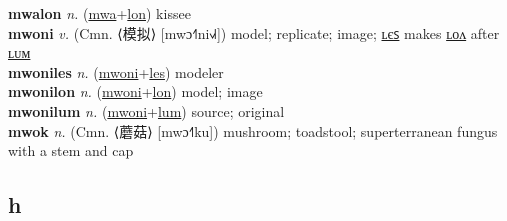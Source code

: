 \textbf{mwalon} \textit{n.} (\hyperref[mwa]{mwa}+\hyperref[lon]{lon})
kissee \label{mwalon} \\
\textbf{mwoni} \textit{v.} (Cmn. ⟨模拟⟩ [mwɔ˧˥ni˧˩˧])
model; replicate; image; \hyperref[mwoniles]{ʟєꜱ} makes \hyperref[mwonilon]{ʟᴏᴧ} after \hyperref[mwonilum]{ʟᴜᴍ} \label{mwoni} \\
\textbf{mwoniles} \textit{n.} (\hyperref[mwoni]{mwoni}+\hyperref[les]{les})
modeler \label{mwoniles} \\
\textbf{mwonilon} \textit{n.} (\hyperref[mwoni]{mwoni}+\hyperref[lon]{lon})
model; image \label{mwonilon} \\
\textbf{mwonilum} \textit{n.} (\hyperref[mwoni]{mwoni}+\hyperref[lum]{lum})
source; original \label{mwonilum} \\
\textbf{mwok} \textit{n.} (Cmn. ⟨蘑菇⟩ [mwɔ˧˥ku])
mushroom; toadstool; superterranean fungus with a stem and cap \label{mwok} \\
\subsection{h}

